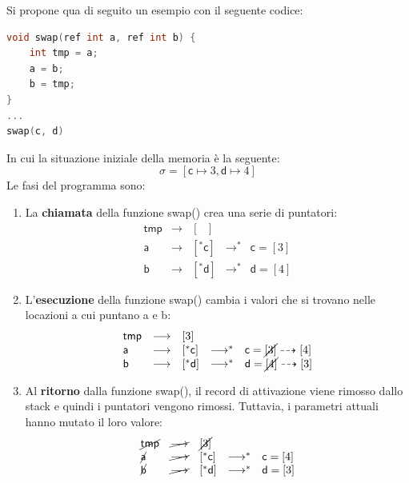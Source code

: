 \documentclass[a4paper]{article}
\begin{document}
	\noindent
	Si propone qua di seguito un esempio con il seguente codice:
	\begin{lstlisting}[language=C]
void swap(ref int a, ref int b) {
	int tmp = a;
	a = b;
	b = tmp;
}
...
swap(c, d)\end{lstlisting}
	In cui la situazione iniziale della memoria è la seguente:
	\begin{equation*}
		\sigma = \left[\textsf{c} \mapsto 3, \textsf{d} \mapsto 4\right]
	\end{equation*}
	Le fasi del programma sono:
	\begin{enumerate}
		\item La \textbf{chiamata} della funzione \textsf{swap()} crea una serie di puntatori:
		\begin{equation*}
			\begin{array}{lllll}
				\textsf{tmp} &\longrightarrow& \left[ \:\:\: \right] \\
				\textsf{a} 	 &\longrightarrow& \left[ ^{*}\textsf{c} \right] &\longrightarrow^{*}& \textsf{c} = \left[3\right] \\
				\textsf{b} 	 &\longrightarrow& \left[ ^{*}\textsf{d} \right] &\longrightarrow^{*}& \textsf{d} = \left[4\right]
			\end{array}
		\end{equation*}

		\item L'\textbf{esecuzione} della funzione \textsf{swap()} cambia i valori che si trovano nelle locazioni a cui puntano \textsf{a} e \textsf{b}:
		\begin{equation*}
			\begin{array}{lllll}
				\textsf{tmp} &\longrightarrow& \left[ 3 \right] \\
				\textsf{a} 	 &\longrightarrow& \left[ ^{*}\textsf{c} \right] &\longrightarrow^{*}& \textsf{c} = \cancel{\left[3\right]} \dashrightarrow \left[4\right] \\
				\textsf{b} 	 &\longrightarrow& \left[ ^{*}\textsf{d} \right] &\longrightarrow^{*}& \textsf{d} = \cancel{\left[4\right]} \dashrightarrow \left[3\right]
			\end{array}
		\end{equation*}

		\item Al \textbf{ritorno} dalla funzione \textsf{swap()}, il record di attivazione viene rimosso dallo stack e quindi i puntatori vengono rimossi. Tuttavia, i parametri attuali hanno mutato il loro valore:
		\begin{equation*}
			\begin{array}{lllll}
				\cancel{\textsf{tmp}} &\cancel{\longrightarrow}& \cancel{\left[ 3 \right]} \\
				\cancel{\textsf{a}} 	 &\cancel{\longrightarrow}& \left[ ^{*}\textsf{c} \right] &\longrightarrow^{*}& \textsf{c} = \left[4\right] \\
				\cancel{\textsf{b}} 	 &\cancel{\longrightarrow}& \left[ ^{*}\textsf{d} \right] &\longrightarrow^{*}& \textsf{d} = \left[3\right]
			\end{array}
		\end{equation*}
	\end{enumerate}\newpage
	
\end{document}
